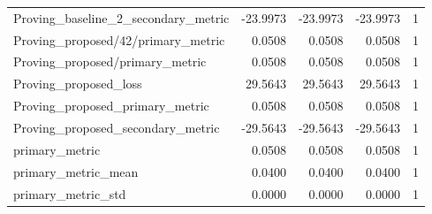 \begin{table}[h]
\begin{tabular}{lrrrr}
Proving_baseline_2_secondary_metric & -23.9973 & -23.9973 & -23.9973 & 1 \\
Proving_proposed/42/primary_metric & 0.0508 & 0.0508 & 0.0508 & 1 \\
Proving_proposed/primary_metric & 0.0508 & 0.0508 & 0.0508 & 1 \\
Proving_proposed_loss & 29.5643 & 29.5643 & 29.5643 & 1 \\
Proving_proposed_primary_metric & 0.0508 & 0.0508 & 0.0508 & 1 \\
Proving_proposed_secondary_metric & -29.5643 & -29.5643 & -29.5643 & 1 \\
primary_metric & 0.0508 & 0.0508 & 0.0508 & 1 \\
primary_metric_mean & 0.0400 & 0.0400 & 0.0400 & 1 \\
primary_metric_std & 0.0000 & 0.0000 & 0.0000 & 1 \\
\hline
\end{tabular}
\end{table}